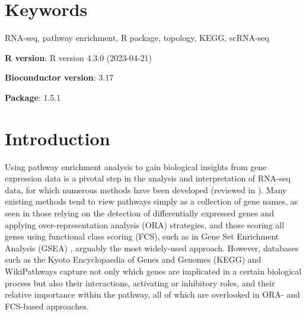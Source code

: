 \documentclass[9pt,a4paper,]{extarticle}
\begin{document}
\section*{Keywords}
RNA-seq, pathway enrichment, R package, topology, KEGG, scRNA-seq


\clearpage
\pagestyle{main}

\textbf{R version}: R version 4.3.0 (2023-04-21)

\textbf{Bioconductor version}: 3.17

\textbf{Package}: 1.5.1

\hypertarget{introduction}{%
\section{Introduction}\label{introduction}}

Using pathway enrichment analysis to gain biological insights from gene expression data is a pivotal step in the analysis and interpretation of RNA-seq data, for which numerous methods have been developed (reviewed in \citep{Maleki2020-ur, Mubeen2022-eq}).
Many existing methods tend to view pathways simply as a collection of gene names, as seen in those relying on the detection of differentially expressed genes and applying over-representation analysis (ORA) strategies, and those scoring all genes using functional class scoring (FCS), such as in Gene Set Enrichment Analysis (GSEA) \citep{Subramanian2005-lx}, arguably the most widely-used approach.
However, databases such as the Kyoto Encyclopaedia of Genes and Genomes (KEGG)\citep{OgataKEGGKyotoEncyclopediaa} and WikiPathways\citep{Martens2021} capture not only which genes are implicated in a certain biological process but also their interactions, activating or inhibitory roles, and their relative importance within the pathway, all of which are overlooked in ORA- and FCS-based approaches.
\end{document}
